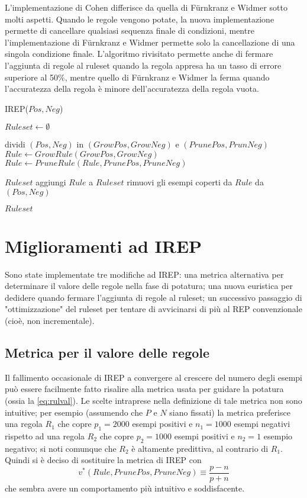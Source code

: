 L'implementazione di Cohen differisce da quella di Fürnkranz e Widmer sotto molti aspetti. Quando le regole vengono potate, la nuova implementazione permette di cancellare qualsiasi sequenza finale di condizioni, mentre l'implementazione di Fürnkranz e Widmer permette solo la cancellazione di una singola condizione finale. L'algoritmo rivisitato permette anche di fermare l'aggiunta di regole al ruleset quando la regola appresa ha un tasso di errore superiore al 50\%, mentre quello di Fürnkranz e Widmer la ferma quando l'accuratezza della regola è minore dell'accuratezza della regola vuota.

\begin{algorithm}[!htbp]
	\caption{IREP($Pos, Neg$)}
	\label{alg:irep}
	\begin{algorithmic}[1]
		\State $Ruleset \gets \emptyset$
				
		\State dividi $(Pos, Neg)$ in $(GrowPos, GrowNeg)$ e $(PrunePos, PrunNeg)$
		\State $Rule \gets GrowRule(GrowPos, GrowNeg)$
		\State $Rule \gets PruneRule(Rule, PrunePos, PruneNeg)$
				
		\State \Return $Ruleset$
		\Else
		\State aggiungi $Rule$ a $Ruleset$
		\State rimuovi gli esempi coperti da $Rule$ da $(Pos, Neg)$
		\EndIf
		\EndWhile
				
		\State \Return $Ruleset$
	\end{algorithmic}
\end{algorithm}

\pagebreak

\section{Miglioramenti ad IREP}
Sono state implementate tre modifiche ad IREP: una metrica alternativa per determinare il valore delle regole nella fase di potatura; una nuova euristica per dedidere quando fermare l'aggiunta di regole al ruleset; un successivo passaggio di "ottimizzazione" del ruleset per tentare di avvicinarsi di più al REP convenzionale (cioè, non incrementale).

\subsection*{Metrica per il valore delle regole}
Il fallimento occasionale di IREP a convergere al crescere del numero degli esempi può essere facilmente fatto risalire alla metrica usata per guidare la potatura (ossia la \eqref{eq:rulval}). Le scelte intraprese nella definizione di tale metrica non sono intuitive; per esempio (assumendo che $P$ e $N$ siano fissati) la metrica preferisce una regola $R_1$ che copre $p_1 = 2000$ esempi positivi e $n_1 = 1000$ esempi negativi rispetto ad una regola $R_2$ che copre $p_2 = 1000$ esempi positivi e $n_2 = 1$ esempio negativo; si noti comunque che $R_2$ è altamente predittiva, al contrario di $R_1$. Quindi si è deciso di sostituire la metrica di IREP con $$v^*(Rule, PrunePos, PruneNeg) \equiv \frac{p - n}{p + n}$$ che sembra avere un comportamento più intuitivo e soddisfacente.

